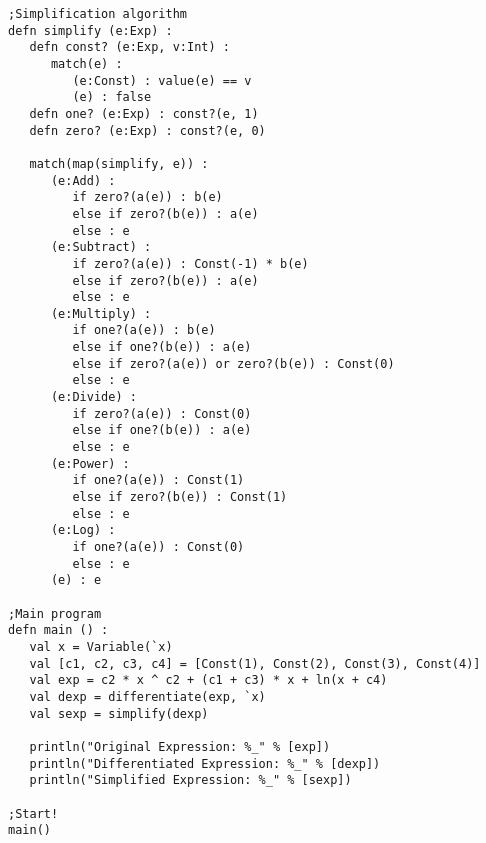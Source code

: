 \documentclass[10pt,oneside]{book}
\begin{document}
\begin{lstlisting}
;Simplification algorithm
defn simplify (e:Exp) :
   defn const? (e:Exp, v:Int) :
      match(e) :
         (e:Const) : value(e) == v
         (e) : false
   defn one? (e:Exp) : const?(e, 1)
   defn zero? (e:Exp) : const?(e, 0)   

   match(map(simplify, e)) :
      (e:Add) :
         if zero?(a(e)) : b(e)
         else if zero?(b(e)) : a(e)
         else : e
      (e:Subtract) :
         if zero?(a(e)) : Const(-1) * b(e)
         else if zero?(b(e)) : a(e)
         else : e         
      (e:Multiply) :
         if one?(a(e)) : b(e)
         else if one?(b(e)) : a(e)
         else if zero?(a(e)) or zero?(b(e)) : Const(0)
         else : e
      (e:Divide) :
         if zero?(a(e)) : Const(0)
         else if one?(b(e)) : a(e)
         else : e
      (e:Power) :
         if one?(a(e)) : Const(1)
         else if zero?(b(e)) : Const(1)
         else : e
      (e:Log) :
         if one?(a(e)) : Const(0)
         else : e
      (e) : e

;Main program
defn main () :
   val x = Variable(`x)
   val [c1, c2, c3, c4] = [Const(1), Const(2), Const(3), Const(4)]
   val exp = c2 * x ^ c2 + (c1 + c3) * x + ln(x + c4)
   val dexp = differentiate(exp, `x)
   val sexp = simplify(dexp)

   println("Original Expression: %_" % [exp])
   println("Differentiated Expression: %_" % [dexp])
   println("Simplified Expression: %_" % [sexp])   

;Start!
main()
\end{lstlisting}
\end{document}

